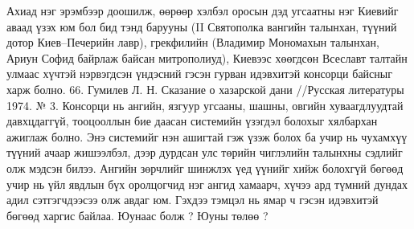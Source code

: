 Ахиад нэг эрэмбээр доошилж, өөрөөр хэлбэл оросын дэд угсаатны нэг Киевийг аваад үзэх юм бол бид тэнд барууны (II Святополка вангийн талынхан, түүний дотор Киев–Печерийн лавр), грекфилийн (Владимир Мономахын талынхан, Ариун Софид байрлаж байсан митрополиуд), Киевээс хөөгдсөн Всеславт талтайн улмаас хүчтэй нэрвэгдсэн үндэсний гэсэн гурван идэвхитэй консорци байсныг харж болно. 66. Гумилев Л. Н. Сказание о хазарской дани //Русская литературы 1974. № 3.
Консорци нь ангийн, язгуур угсааны, шашны, овгийн хуваагдлуудтай давхцдаггүй, тооцооллын бие даасан системийн үзэгдэл болохыг хялбархан ажиглаж болно. Энэ системийг нэн ашигтай гэж үзэж болох ба учир нь чухамхүү түүний ачаар жишээлбэл, дээр дурдсан улс төрийн чиглэлийн талынхны сэдлийг олж мэдсэн билээ. Ангийн зөрчлийг шинжлэх үед үүнийг хийж болохгүй бөгөөд учир нь үйл явдлын бүх оролцогчид нэг ангид хамаарч, хүчээ ард түмний дундах адил сэтгэгчдээсээ олж авдаг юм. Гэхдээ тэмцэл нь ямар ч гэсэн идэвхитэй бөгөөд харгис байлаа. Юунаас болж ? Юуны төлөө ?
